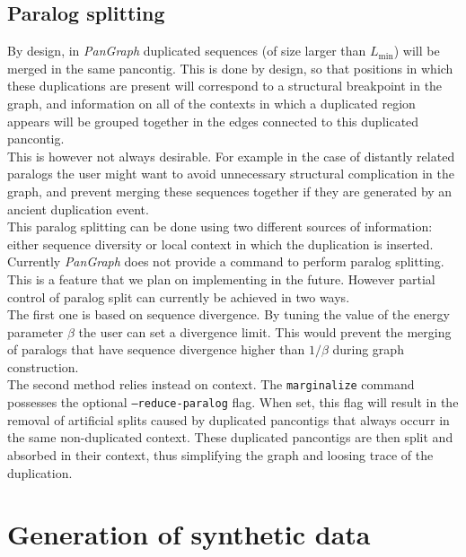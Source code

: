 \documentclass[aps,rmp,reprint,superscriptaddress,notitlepage,10pt,onecolumn]{revtex4-1}
\newcommand{\Lthr}{L_{\min}}
\begin{document}

\subsection{Paralog splitting}

By design, in \textit{PanGraph} duplicated sequences (of size larger than $\Lthr$) will be merged in the same pancontig. This is done by design, so that positions in which these duplications are present will correspond to a structural breakpoint in the graph, and information on all of the contexts in which a duplicated region appears will be grouped together in the edges connected to this duplicated pancontig.\\
This is however not always desirable. For example in the case of distantly related paralogs the user might want to avoid unnecessary structural complication in the graph, and prevent merging these sequences together if they are generated by an ancient duplication event.\\

This paralog splitting can be done using two different sources of information: either sequence diversity or local context in which the duplication is inserted. Currently \textit{PanGraph} does not provide a command to perform paralog splitting. This is a feature that we plan on implementing in the future. However partial control of paralog split can currently be achieved in two ways.\\
The first one is based on sequence divergence. By tuning the value of the energy parameter $\beta$ the user can set a divergence limit. This would prevent the merging of paralogs that have sequence divergence higher than $1/\beta$ during graph construction.\\
The second method relies instead on context. The \texttt{marginalize} command possesses the optional \texttt{--reduce-paralog} flag. When set, this flag will result in the removal of artificial splits caused by duplicated pancontigs that always occurr in the same non-duplicated context. These duplicated pancontigs are then split and absorbed in their context, thus simplifying the graph and loosing trace of the duplication.\\


\section{Generation of synthetic data}
\label{sec:data_generation}
\end{document}
